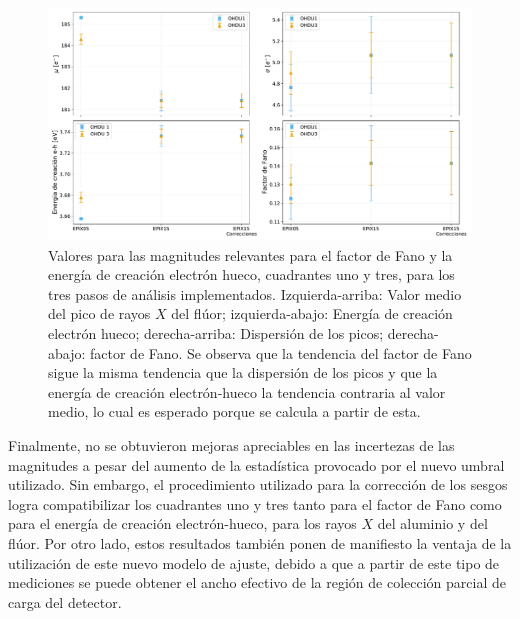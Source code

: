 \begin{figure}[h]
    \centering
        \includegraphics[scale=0.45]{Figs/F_mu_sigma_fano_Eeh.pdf}
    \caption{Valores para las magnitudes relevantes para el factor de Fano y la energía de creación electrón hueco, cuadrantes uno y tres, para los tres pasos de análisis implementados. Izquierda-arriba: Valor medio del pico de rayos $X$ del flúor; izquierda-abajo: Energía de creación electrón hueco; derecha-arriba: Dispersión de los picos; derecha-abajo: factor de Fano. Se observa que la tendencia del factor de Fano sigue la misma tendencia que la dispersión de los picos y que la energía de creación electrón-hueco la tendencia contraria al valor medio, lo cual es esperado porque se calcula a partir de esta.}
    \label{fig:F_mu_sigma_fano_eh}
\end{figure}

Finalmente, no se obtuvieron mejoras apreciables en las incertezas de las magnitudes a pesar del aumento de la estadística provocado por el nuevo umbral utilizado. Sin embargo, el procedimiento utilizado para la corrección de los sesgos logra compatibilizar los cuadrantes uno y tres tanto para el factor de Fano como para el energía de creación electrón-hueco, para los rayos $X$ del aluminio y del flúor. Por otro lado, estos resultados también ponen de manifiesto la ventaja de la utilización de este nuevo modelo de ajuste, debido a que a partir de este tipo de mediciones se puede obtener el ancho efectivo de la región de colección parcial de carga del detector.

